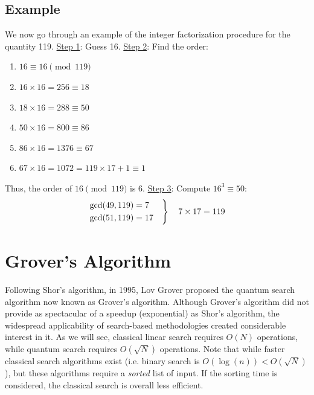 \documentclass[11pt]{article} %
\begin{document}
\subsection{Example}
We now go through an example of the integer factorization procedure for the quantity 119. 
\newline\newline
\underline{Step 1}: Guess 16.
\newline\newline
\underline{Step 2}: Find the order:
\begin{enumerate}
    \item $16\equiv 16\pmod{119}$
    \item $16\times16=256\equiv18$
    \item $18\times16=288\equiv50$
    \item $50\times16=800\equiv86$
    \item $86\times16=1376\equiv67$
    \item $67\times16=1072=119\times17+1\equiv1$
\end{enumerate}
Thus, the order of $16\pmod{119}$ is 6.
\newline\newline
\underline{Step 3}: Compute $16^3\equiv 50$:
\begin{equation*}
    \begin{rcases}
        \gcd(49,119)=7 \\
        \gcd(51,119)=17 \quad
    \end{rcases}
    \quad7\times17=119
\end{equation*}

\section{Grover's Algorithm}
Following Shor's algorithm, in 1995, Lov Grover proposed the quantum search algorithm now known as Grover's algorithm. Although Grover's algorithm did not provide as spectacular of a speedup (exponential) as Shor's algorithm, the widespread applicability of search-based methodologies created considerable interest in it. 
\newline
\newline
As we will see, classical linear search requires $O(N)$ operations, while quantum search requires $O(\sqrt{N})$ operations. Note that while faster classical search algorithms exist (i.e. binary search is $O(\log(n))<O(\sqrt{N})$), but these algorithms require a \textit{sorted} list of input. If the sorting time is considered, the classical search is overall less efficient.
\end{document}

